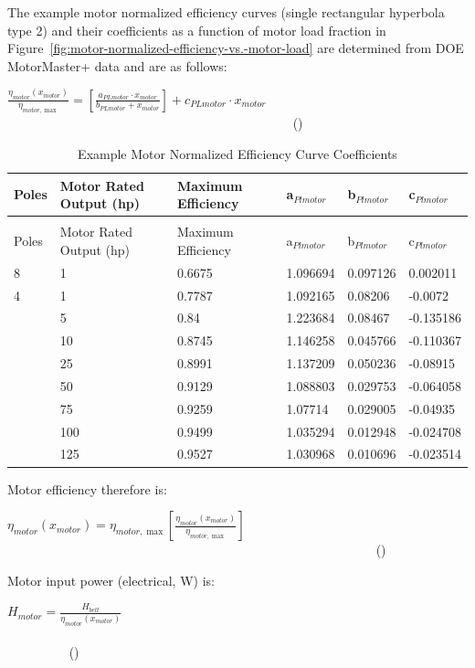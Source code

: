 The example motor normalized efficiency curves (single rectangular hyperbola type 2) and their coefficients as a function of motor load fraction in Figure~\ref{fig:motor-normalized-efficiency-vs.-motor-load} are determined from DOE MotorMaster+ data and are as follows:

\(\frac{{{\eta_{motor}}({x_{motor}})}}{{{\eta_{motor,\max }}}} = \left[ {\frac{{{a_{PLmotor}} \cdot {x_{motor}}}}{{{b_{PLmotor}} + {x_{motor}}}}} \right] + {c_{PLmotor}} \cdot {x_{motor}}\) ~~~~~~~~~~~~~~~~~~~~~~~~~~~~~~~~~~~~~~~~~~~~ ()

\begin{longtable}[c]{p{1.0in}p{1.0in}p{1.0in}p{1.0in}p{1.0in}p{1.0in}}
\caption{Example Motor Normalized Efficiency Curve Coefficients \label{table:example-motor-normalized-efficiency-curve}} \tabularnewline
\toprule 
Poles & Motor Rated Output (hp) & Maximum Efficiency & a\(_{Plmotor}\) & b\(_{Plmotor}\) & c\(_{Plmotor}\) \tabularnewline \midrule
\midrule
\endfirsthead

\caption[]{Example Motor Normalized Efficiency Curve Coefficients} \tabularnewline
\toprule 
Poles & Motor Rated Output (hp) & Maximum Efficiency & a\(_{Plmotor}\) & b\(_{Plmotor}\) & c\(_{Plmotor}\) \tabularnewline \midrule
\midrule
\endhead

8 & 1 & 0.6675 & 1.096694 & 0.097126 & 0.002011 \tabularnewline
4 & 1 & 0.7787 & 1.092165 & 0.08206 & -0.0072 \tabularnewline
 & 5 & 0.84 & 1.223684 & 0.08467 & -0.135186 \tabularnewline
 & 10 & 0.8745 & 1.146258 & 0.045766 & -0.110367 \tabularnewline
 & 25 & 0.8991 & 1.137209 & 0.050236 & -0.08915 \tabularnewline
 & 50 & 0.9129 & 1.088803 & 0.029753 & -0.064058 \tabularnewline
 & 75 & 0.9259 & 1.07714 & 0.029005 & -0.04935 \tabularnewline
 & 100 & 0.9499 & 1.035294 & 0.012948 & -0.024708 \tabularnewline
 & 125 & 0.9527 & 1.030968 & 0.010696 & -0.023514 \tabularnewline
\bottomrule
\end{longtable}

Motor efficiency therefore is:

\({\eta_{motor}}({x_{motor}}) = {\eta_{motor,\max }}\left[ {\frac{{{\eta_{motor}}({x_{motor}})}}{{{\eta_{motor,\max }}}}} \right]\) ~~~~~~~~~~~~~~~~~~~~~~~~~~~~~~~~~~~~~~~~~~~~~~~~~~~~~~~~~ ()

Motor input power (electrical, W) is:

\({H_{motor}} = \frac{{{H_{belt}}}}{{{\eta_{motor}}({x_{motor}})}}\) ~~~~~~~~~~~~~~~~~~~~~~~~~~~~~~~~~~~~~~~~~~~~~~~~~~~~~~~~~~~~~~~~~~~~~~~~~~~~~~~~~ ()

